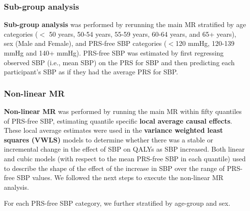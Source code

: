 \documentclass[11pt]{article}
\newcounter{subsubsubsection}[subsubsection]
\begin{document}
\color{violet}
\begin{stlog}\end{stlog}
\color{black}
\newpage
\subsubsection{Sub-group analysis}

\textbf{Sub-group analysis} was performed by rerunning the main MR stratified by age categories ($<$ 50 years, 50-54 years, 55-59 years, 60-64 years, and 65+ years), sex (Male and Female), and PRS-free SBP categories ($<$120 mmHg, 120-139 mmHg and 140+ mmHg). PRS-free SBP was estimated by first regressing observed SBP (i.e., mean SBP) on the PRS for SBP and then predicting each participant's SBP as if they had the average PRS for SBP\cite{harrison2021long}. 
\color{violet}
\begin{stlog}\end{stlog}
\color{black}
\newpage
\subsubsection{Non-linear MR}

\textbf{Non-linear MR} was performed by running the main MR within fifty quantiles of PRS-free SBP, estimating quantile specific \textbf{local average causal effects}. These local average estimates were used in the \textbf{variance weighted least squares (VWLS)} models to determine whether there was a stable or incremental change in the effect of SBP on QALYs as SBP increased. Both linear and cubic models (with respect to the mean PRS-free SBP in each quantile) used to describe the shape of the effect of the increase in SBP over the range of PRS-free SBP values. We followed the next steps to execute the non-linear MR analysis. 
 
\color{violet}
\begin{stlog}\end{stlog}
\color{black}

For each PRS-free SBP category, we further stratified by age-group and sex. 
\color{violet}
\begin{stlog}\end{stlog}
\color{black}
\color{violet}
\begin{stlog}\end{stlog}
\color{black}
\color{violet}
\begin{stlog}\end{stlog}
\color{black}
\end{document}
